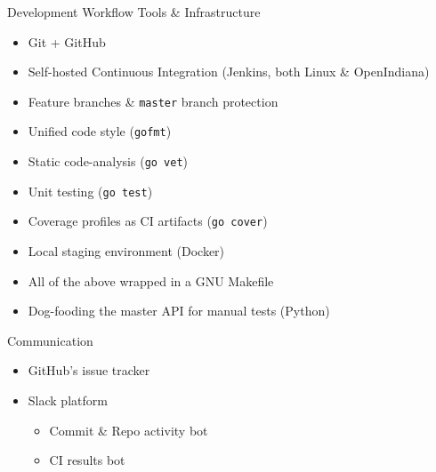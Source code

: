 \documentclass[11pt,aspectratio=169]{beamer}
\begin{document}
    \begin{frame}{Development Workflow}
        Tools \& Infrastructure
        \begin{itemize}
            \pause \item Git + GitHub
            \pause \item Self-hosted Continuous Integration (Jenkins, both Linux \& OpenIndiana)
            \pause \item Feature branches \& \texttt{master} branch protection
            \pause \item Unified code style (\texttt{gofmt})
            \pause \item Static code-analysis (\texttt{go vet})
            \pause \item Unit testing (\texttt{go test})
            \pause \item Coverage profiles as CI artifacts (\texttt{go cover})
            \pause \item Local staging environment (Docker)
            \pause \item All of the above wrapped in a GNU Makefile
            \pause \item Dog-fooding the master API for manual tests (Python)
        \end{itemize}
    \end{frame}
   \begin{frame}{Communication}
        \begin{itemize}
            \pause \item GitHub's issue tracker
            \pause \item Slack platform
            \begin{itemize}
                \pause \item Commit \& Repo activity bot
                \pause \item CI results bot
            \end{itemize}
        \end{itemize}
    \end{frame}
    
\end{document}
